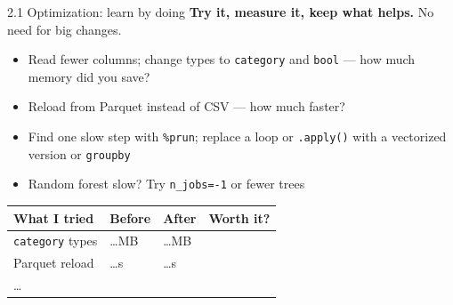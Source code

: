 \documentclass[aspectratio=43,11pt]{beamer}
\begin{document}
\begin{frame}{2.1 Optimization: learn by doing}
  \textbf{Try it, measure it, keep what helps.} No need for big changes.
  \vspace{0.5em}
  \begin{itemize}
    \item Read fewer columns; change types to \texttt{category} and \texttt{bool}
          --- how much memory did you save?
    \item Reload from Parquet instead of CSV --- how much faster?
    \item Find one slow step with \texttt{\%prun}; replace a loop or
          \texttt{.apply()} with a vectorized version or \texttt{groupby}
    \item Random forest slow? Try \texttt{n\_jobs=-1} or fewer trees
  \end{itemize}
  \vspace{0.5em}
  \begin{center}
  \footnotesize
  \begin{tabular}{@{}llll@{}}
    \toprule
    What I tried & Before & After & Worth it? \\
    \midrule
    \texttt{category} types & \dots MB & \dots MB & \\
    Parquet reload & \dots s & \dots s & \\
    \dots & & & \\
    \bottomrule
  \end{tabular}
  \end{center}
\end{frame}
\end{document}
